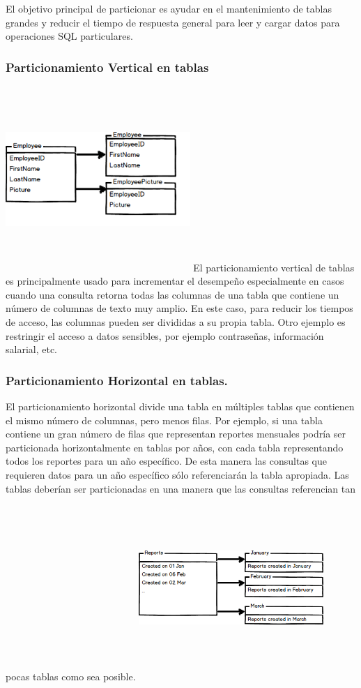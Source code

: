 \documentclass[twoside,twocolumn]{article}
\begin{document}
El objetivo principal de particionar es ayudar en el mantenimiento de 
tablas grandes y reducir el tiempo de respuesta general para leer y cargar
 datos para operaciones SQL particulares. 
\subsubsection{Particionamiento Vertical en tablas}
\includegraphics[width=7cm, height=7cm]{Imagenes/img1.png}
El particionamiento vertical de tablas es principalmente usado para 
incrementar el desempeño especialmente en casos cuando una consulta
 retorna todas las columnas de una tabla que contiene un número de
  columnas de texto muy amplio. En este caso, para reducir los tiempos 
  de acceso, las columnas pueden ser divididas a su propia tabla. 
  Otro ejemplo es restringir el acceso a datos sensibles, por ejemplo 
  contraseñas, información salarial, etc.
\subsubsection{Particionamiento Horizontal en tablas.}
El particionamiento horizontal divide una tabla en múltiples tablas que
 contienen el mismo número de columnas, pero menos filas. Por ejemplo, 
 si una tabla contiene un gran número de filas que representan reportes
  mensuales podría ser particionada horizontalmente en tablas por años, 
  con cada tabla representando todos los reportes para un año específico.
   De esta manera las consultas que requieren datos para un año específico
    sólo referenciarán la tabla apropiada. Las tablas deberían ser particionadas
     en una manera que las consultas referencian tan pocas tablas como sea posible.
\includegraphics[width=7cm, height=7cm]{Imagenes/img2.png}
\end{document}
